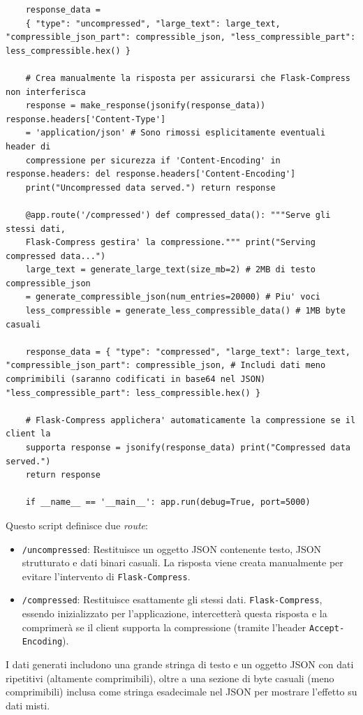 \begin{longlisting}
\begin{verbatim}
    response_data =
    { "type": "uncompressed", "large_text": large_text, "compressible_json_part": compressible_json, "less_compressible_part": less_compressible.hex() }

    # Crea manualmente la risposta per assicurarsi che Flask-Compress non interferisca
    response = make_response(jsonify(response_data)) response.headers['Content-Type']
    = 'application/json' # Sono rimossi esplicitamente eventuali header di
    compressione per sicurezza if 'Content-Encoding' in response.headers: del response.headers['Content-Encoding']
    print("Uncompressed data served.") return response

    @app.route('/compressed') def compressed_data(): """Serve gli stessi dati,
    Flask-Compress gestira' la compressione.""" print("Serving compressed data...")
    large_text = generate_large_text(size_mb=2) # 2MB di testo compressible_json
    = generate_compressible_json(num_entries=20000) # Piu' voci
    less_compressible = generate_less_compressible_data() # 1MB byte casuali

    response_data = { "type": "compressed", "large_text": large_text, "compressible_json_part": compressible_json, # Includi dati meno comprimibili (saranno codificati in base64 nel JSON) "less_compressible_part": less_compressible.hex() }

    # Flask-Compress applichera' automaticamente la compressione se il client la
    supporta response = jsonify(response_data) print("Compressed data served.")
    return response

    if __name__ == '__main__': app.run(debug=True, port=5000)
  \end{verbatim}
\end{longlisting}

Questo script definisce due \textit{route}:
\begin{itemize}
  \item \texttt{/uncompressed}: Restituisce un oggetto JSON contenente testo,
    JSON strutturato e dati binari casuali. La risposta viene creata manualmente
    per evitare l'intervento di \texttt{Flask-Compress}.

  \item \texttt{/compressed}: Restituisce esattamente gli stessi dati. \texttt{Flask-Compress},
    essendo inizializzato per l'applicazione, intercetterà questa risposta e la comprimerà
    se il client supporta la compressione (tramite l'header \texttt{Accept-Encoding}).
\end{itemize}
I dati generati includono una grande stringa di testo e un oggetto JSON con dati
ripetitivi (altamente comprimibili), oltre a una sezione di byte casuali (meno comprimibili)
inclusa come stringa esadecimale nel JSON per mostrare l'effetto su dati misti.

